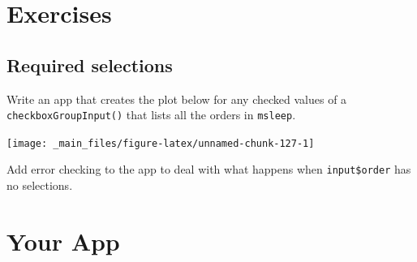 \documentclass[
  oneside]{book}
\newenvironment{Shaded}{\begin{snugshade}}{\end{snugshade}}
\newcommand{\AttributeTok}[1]{\textcolor[rgb]{0.77,0.63,0.00}{#1}}
\newcommand{\CommentTok}[1]{\textcolor[rgb]{0.56,0.35,0.01}{\textit{#1}}}
\newcommand{\DecValTok}[1]{\textcolor[rgb]{0.00,0.00,0.81}{#1}}
\newcommand{\FunctionTok}[1]{\textcolor[rgb]{0.00,0.00,0.00}{#1}}
\newcommand{\NormalTok}[1]{#1}
\newcommand{\OtherTok}[1]{\textcolor[rgb]{0.56,0.35,0.01}{#1}}
\newcommand{\SpecialCharTok}[1]{\textcolor[rgb]{0.00,0.00,0.00}{#1}}
\newcommand{\StringTok}[1]{\textcolor[rgb]{0.31,0.60,0.02}{#1}}
\begin{document}
\hypertarget{exercises-debugging}{%
\section{Exercises}\label{exercises-debugging}}

\hypertarget{required-selections}{%
\subsection*{Required selections}\label{required-selections}}

Write an app that creates the plot below for any checked values of a \texttt{checkboxGroupInput}\texttt{()} that lists all the orders in \texttt{msleep}.

\begin{Shaded}
\end{Shaded}

\begin{center}\texttt{[image: \_main\_files/figure-latex/unnamed-chunk-127-1]} \end{center}

Add error checking to the app to deal with what happens when \texttt{input\$order} has no selections.

\hypertarget{your-app-debugging}{%
\section{Your App}\label{your-app-debugging}}
\end{document}
